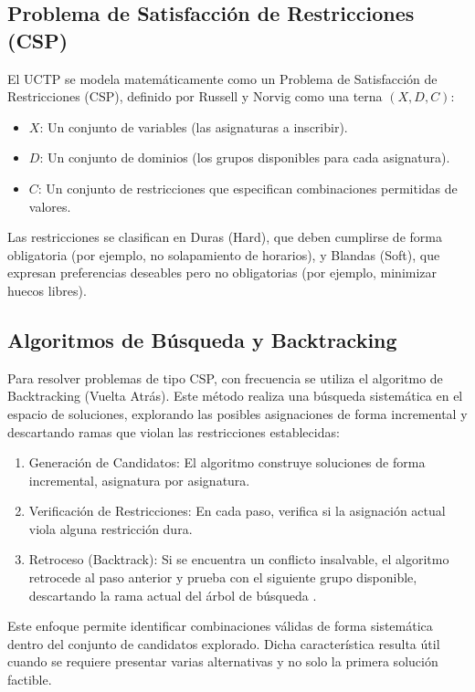 \subsection{Problema de Satisfacción de Restricciones (CSP)}
El UCTP se modela matemáticamente como un Problema de Satisfacción de Restricciones (CSP), definido por Russell y Norvig \cite{russell2021ai} como una terna $(X, D, C)$:
\begin{itemize}
    \item $X$: Un conjunto de variables (las asignaturas a inscribir).
    \item $D$: Un conjunto de dominios (los grupos disponibles para cada asignatura).
    \item $C$: Un conjunto de restricciones que especifican combinaciones permitidas de valores.
\end{itemize}

Las restricciones se clasifican en Duras (Hard), que deben cumplirse de forma obligatoria (por ejemplo, no solapamiento de horarios), y Blandas (Soft), que expresan preferencias deseables pero no obligatorias (por ejemplo, minimizar huecos libres).

\subsection{Algoritmos de Búsqueda y Backtracking}
Para resolver problemas de tipo CSP, con frecuencia se utiliza el algoritmo de Backtracking (Vuelta Atrás). Este método realiza una búsqueda sistemática en el espacio de soluciones, explorando las posibles asignaciones de forma incremental y descartando ramas que violan las restricciones establecidas:

\begin{enumerate}
    \item Generación de Candidatos: El algoritmo construye soluciones de forma incremental, asignatura por asignatura.
    \item Verificación de Restricciones: En cada paso, verifica si la asignación actual viola alguna restricción dura.
    \item Retroceso (Backtrack): Si se encuentra un conflicto insalvable, el algoritmo retrocede al paso anterior y prueba con el siguiente grupo disponible, descartando la rama actual del árbol de búsqueda \cite{cormen_algorithms}.
\end{enumerate}

Este enfoque permite identificar combinaciones válidas de forma sistemática dentro del conjunto de candidatos explorado. Dicha característica resulta útil cuando se requiere presentar varias alternativas y no solo la primera solución factible.

